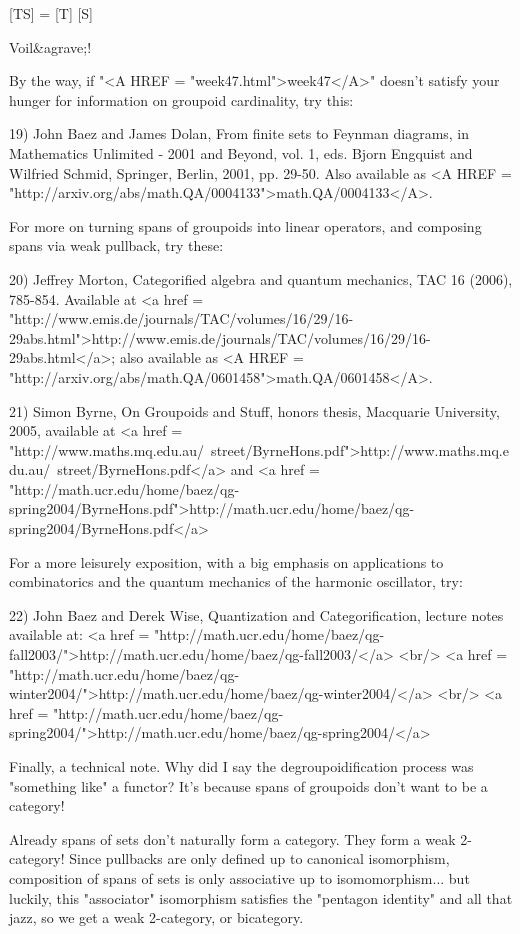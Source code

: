 [TS] = [T] [S]

Voil&agrave;!

By the way, if "<A HREF = "week47.html">week47</A>" doesn't satisfy your hunger for information on
groupoid cardinality, try this: 

19) John Baez and James Dolan, From finite sets to Feynman diagrams, in 
Mathematics Unlimited - 2001 and Beyond, vol. 1, eds. Bjorn Engquist 
and Wilfried Schmid, Springer, Berlin, 2001, pp. 29-50.  Also 
available as <A HREF = "http://arxiv.org/abs/math.QA/0004133">math.QA/0004133</A>.

For more on turning spans of groupoids into linear operators, and
composing spans via weak pullback, try these:

20) Jeffrey Morton, Categorified algebra and quantum mechanics, 
TAC 16 (2006), 785-854.  Available at 
<a href = "http://www.emis.de/journals/TAC/volumes/16/29/16-29abs.html">http://www.emis.de/journals/TAC/volumes/16/29/16-29abs.html</a>; 
also available as <A HREF = "http://arxiv.org/abs/math.QA/0601458">math.QA/0601458</A>.

21) Simon Byrne, On Groupoids and Stuff, honors thesis, Macquarie 
University, 2005, available at 
<a href = "http://www.maths.mq.edu.au/~street/ByrneHons.pdf">http://www.maths.mq.edu.au/~street/ByrneHons.pdf</a> and 
<a href = "http://math.ucr.edu/home/baez/qg-spring2004/ByrneHons.pdf">http://math.ucr.edu/home/baez/qg-spring2004/ByrneHons.pdf</a>

For a more leisurely exposition, with a big emphasis on applications
to combinatorics and the quantum mechanics of the harmonic oscillator,
try:

22) John Baez and Derek Wise, Quantization and Categorification, 
lecture notes available at: 
<a href = "http://math.ucr.edu/home/baez/qg-fall2003/">http://math.ucr.edu/home/baez/qg-fall2003/</a> <br/>
<a href = "http://math.ucr.edu/home/baez/qg-winter2004/">http://math.ucr.edu/home/baez/qg-winter2004/</a> <br/>
<a href = "http://math.ucr.edu/home/baez/qg-spring2004/">http://math.ucr.edu/home/baez/qg-spring2004/</a>

Finally, a technical note.  Why did I say the degroupoidification
process was "something like" a functor?  It's because spans of 
groupoids don't want to be a category!  

Already spans of sets don't naturally form a category.  They form a 
weak 2-category!   Since pullbacks are only defined up to canonical 
isomorphism, composition of spans of sets is only associative 
up to isomomorphism... but luckily, this "associator" isomorphism 
satisfies the "pentagon identity" and all that jazz, so we get a 
weak 2-category, or bicategory.

